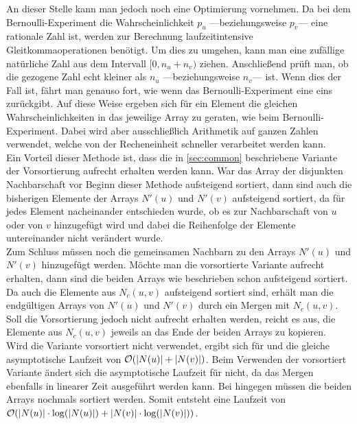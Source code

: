 An dieser Stelle  kann man jedoch noch eine Optimierung vornehmen.
Da bei dem Bernoulli-Experiment die Wahrscheinlichkeit $p_{u}$ ---beziehungsweise $p_{v}$--- eine
rationale Zahl ist, werden zur Berechnung laufzeitintensive Gleitkommaoperationen 
benötigt. Um dies zu umgehen, kann man eine zufällige natürliche Zahl aus dem Intervall
$[0, n_{u} + n_{v})$ ziehen. Anschließend prüft man, ob die gezogene Zahl 
echt kleiner als $n_{u}$ ---beziehungsweise $n_{v}$---
ist. Wenn dies der Fall ist, fährt man genauso fort, wie wenn das Bernoulli-Experiment eine eins
zurückgibt. Auf diese Weise 
ergeben sich für ein Element die gleichen Wahrscheinlichkeiten in das jeweilige Array zu geraten, wie
beim Bernoulli-Experiment. Dabei wird aber ausschließlich Arithmetik auf ganzen Zahlen verwendet, welche
von der Recheneinheit schneller verarbeitet werden kann.
\\

Ein Vorteil dieser Methode ist, dass die in \ref{sec:common} beschriebene Variante der Vorsortierung aufrecht erhalten werden kann.
War das Array der disjunkten Nachbarschaft vor Beginn dieser Methode aufsteigend sortiert,
dann sind auch die bisherigen Elemente der Arrays $N'(u)$ und $N'(v)$ aufsteigend sortiert, da für jedes
Element nacheinander entschieden wurde, ob es zur Nachbarschaft von $u$ oder von $v$ hinzugefügt wird und dabei die
Reihenfolge der Elemente untereinander nicht verändert wurde.
\\

Zum Schluss müssen noch die gemeinsamen Nachbarn zu den Arrays $N'(u)$ und $N'(v)$ hinzugefügt werden.
Möchte man die vorsortierte Variante aufrecht erhalten, dann sind die beiden Arrays wie beschrieben schon
aufsteigend sortiert. Da auch die Elemente aus $N_{c}(u,v)$ aufsteigend sortiert sind, erhält man
die endgültigen Arrays von $N'(u)$ und $N'(v)$ durch ein Mergen mit 
$N_{c}(u,v)$. Soll die Vorsortierung jedoch
nicht aufrecht erhalten werden, reicht es aus, die Elemente aus 
$N_{c}(u,v)$ jeweils an das Ende der beiden Arrays
zu kopieren.
\\

Wird die Variante vorsortiert nicht verwendet, ergibt sich für \perm{} und \distr{}
die gleiche asymptotische Laufzeit von $\mathcal{O}(|N(u)| + |N(v)|)$. 
Beim Verwenden der vorsortiert Variante ändert sich die asymptotische Laufzeit für \distr{}
nicht, da das Mergen ebenfalls in linearer Zeit ausgeführt werden kann. Bei \perm{}
hingegen müssen die beiden Arrays nochmals sortiert werden. Somit entsteht
eine Laufzeit von $\mathcal{O}(|N(u)| \cdot \log(|N(u)|) + |N(v)| \cdot \log(|N(v)|))$.{}
\\

